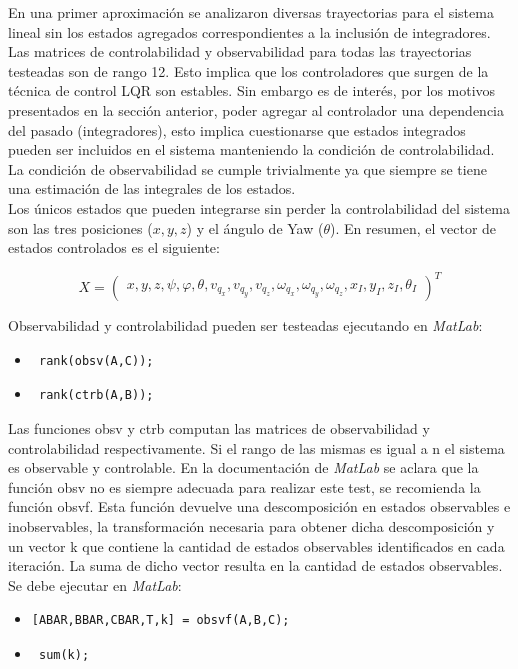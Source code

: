 \documentclass[main]{subfiles}
\begin{document}
En una primer aproximaci\'on se analizaron diversas trayectorias para el sistema lineal sin los estados agregados correspondientes a la inclusi\'on de integradores. Las matrices de controlabilidad y observabilidad para todas las trayectorias testeadas son de rango 12. Esto implica que los controladores que surgen de la t\'ecnica de control LQR son estables. Sin embargo es de inter\'es, por los motivos presentados en la secci\'on anterior, poder agregar al controlador una dependencia del pasado (integradores), esto implica cuestionarse que estados integrados pueden ser incluidos en el sistema manteniendo la condici\'on de controlabilidad. La condici\'on de observabilidad se cumple trivialmente ya que siempre se tiene una estimaci\'on de las integrales de los estados. \\

Los \'unicos estados que pueden integrarse sin perder la controlabilidad del sistema son las tres posiciones ($x,y,z$) y el \'angulo de Yaw ($\theta$). En resumen, el vector de estados controlados es el siguiente:

\begin{equation}
\label{eq:controled}
X = \left(\begin{array}{c}
x,y,z,\psi,\varphi,\theta,v_{q_x},v_{q_y},v_{q_z},\omega_{q_x},\omega_{q_y},\omega_{q_z},x_I,y_I,z_I,\theta_I
\end{array}\right)^T
\end{equation}
  
Observabilidad y controlabilidad pueden ser testeadas ejecutando en \emph{MatLab}:
\begin{itemize}
\item \begin{verbatim} rank(obsv(A,C));
\end{verbatim} 
\item \begin{verbatim} rank(ctrb(A,B));
\end{verbatim}
\end{itemize}
Las funciones obsv y ctrb computan las matrices de observabilidad y controlabilidad respectivamente. Si el rango de las mismas es igual a n el sistema es observable y controlable. En la documentaci\'on de \emph{MatLab} se aclara que la funci\'on obsv no es siempre adecuada para realizar este test, se recomienda la funci\'on obsvf. Esta funci\'on devuelve una descomposici\'on en estados observables e inobservables, la transformaci\'on necesaria para obtener dicha descomposici\'on y un vector k que contiene la cantidad de estados observables identificados en cada iteraci\'on. La suma de dicho vector resulta en la cantidad de estados observables. Se debe ejecutar en \emph{MatLab}:
\vspace{-10pt}
\begin{itemize}
\item \begin{verbatim}[ABAR,BBAR,CBAR,T,k] = obsvf(A,B,C);
\end{verbatim}
\item \begin{verbatim} sum(k);
\end{verbatim}
\end{itemize}
\end{document}
